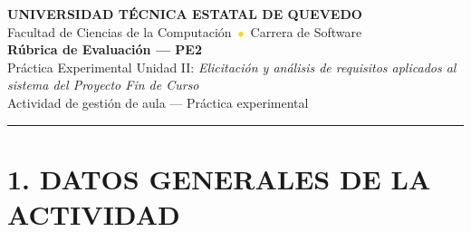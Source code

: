\documentclass[11pt]{article}
\begin{document}
\begin{center}
{\large\textbf{\textcolor{utegreendk}{UNIVERSIDAD TÉCNICA ESTATAL DE QUEVEDO}}}\\[2pt]
{\small Facultad de Ciencias de la Computación \,\textcolor{gold}{$\bullet$}\, Carrera de Software}\\[8pt]
{\LARGE\textbf{\textcolor{utegreendk}{Rúbrica de Evaluación --- PE2}}}\\[4pt]
{\large Práctica Experimental Unidad II: \textit{Elicitación y análisis de requisitos aplicados al sistema del Proyecto Fin de Curso}}\\[2pt]
{\small Actividad de gestión de aula --- Práctica experimental}
\end{center}

\vspace{4pt}
\noindent\textcolor{gold}{\rule{\linewidth}{1.5pt}}

\section*{\textcolor{utegreendk}{1. DATOS GENERALES DE LA ACTIVIDAD}}
\end{document}
